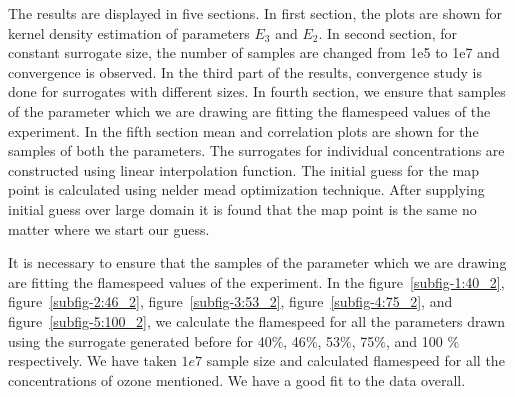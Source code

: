 The results are displayed in five sections. In first section, the plots are shown for kernel density estimation of parameters $E_3$ and $E_2$. In second section, for constant surrogate size, the number of samples are changed from 1e5 to 1e7 and convergence is observed. In the third part of the results, convergence study is done for surrogates with different sizes. In fourth section, we ensure that samples of the parameter which we are drawing are fitting the flamespeed values of the experiment. In the fifth section mean and correlation plots are shown for the samples of both the parameters. The surrogates for individual concentrations are constructed using linear interpolation function. The initial guess for the map point is calculated using nelder mead optimization technique. After supplying initial guess over large domain it is found that the map point is the same no matter where we start our guess.


\bigskip

 It is necessary to ensure that the samples of the parameter which we are drawing are fitting the flamespeed values of the experiment. In the figure~\ref{subfig-1:40_2}, figure~\ref{subfig-2:46_2}, figure~\ref{subfig-3:53_2}, figure~\ref{subfig-4:75_2}, and figure~\ref{subfig-5:100_2},   we calculate the flamespeed for all the parameters drawn using the surrogate generated before for 40$\%$, 46$\%$, 53$\%$, 75$\%$, and 100 $\%$ respectively. We have taken $1e7$ sample size and calculated flamespeed for all the concentrations of ozone mentioned. We have a good fit to the data overall.










